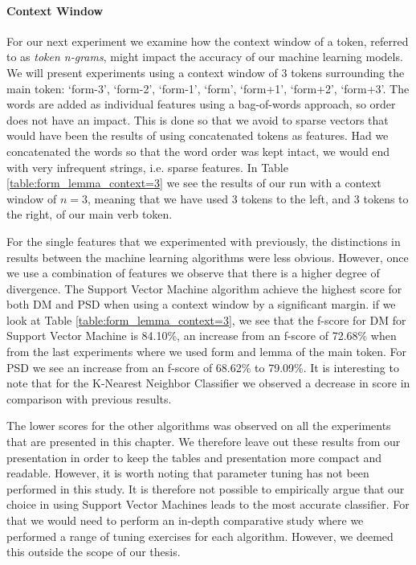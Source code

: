 \paragraph{Context Window} For our next experiment we examine how the context window of a token, referred to as \textit{token n-grams}, might impact the accuracy of our machine learning models. We will present experiments using a context window of 3 tokens surrounding the main token: `form-3', `form-2', `form-1', `form', `form+1', `form+2', `form+3'. The words are added as individual features using a bag-of-words approach, so order does not have an impact. This is done so that we avoid to sparse vectors that would have been the results of using concatenated tokens as features. Had we concatenated the words so that the word order was kept intact, we would end with very infrequent strings, i.e. sparse features. In Table \ref{table:form_lemma_context=3} we see the results of our run with a context window of $n=3$, meaning that we have used 3 tokens to the left, and 3 tokens to the right, of our main verb token.

For the single features that we experimented with previously, the distinctions in results between the machine learning algorithms were less obvious. However, once we use a combination of features we observe that there is a higher degree of divergence. The Support Vector Machine algorithm achieve the highest score for both DM and PSD when using a context window by a significant margin. if we look at Table \ref{table:form_lemma_context=3}, we see that the f-score for DM for Support Vector Machine is 84.10\%, an increase from an f-score of 72.68\% when from the last experiments where we used form and lemma of the main token. For PSD we see an increase from an f-score of 68.62\% to 79.09\%. It is interesting to note that for the K-Nearest Neighbor Classifier we observed a decrease in score in comparison with previous results. 

The lower scores for the other algorithms was observed on all the experiments that are presented in this chapter. We therefore leave out these results from our presentation in order to keep the tables and presentation more compact and readable. However, it is worth noting that parameter tuning has not been performed in this study. It is therefore not possible to empirically argue that our choice in using Support Vector Machines leads to the most accurate classifier. For that we would need to perform an in-depth comparative study where we performed a range of tuning exercises for each algorithm. However, we deemed this outside the scope of our thesis.

